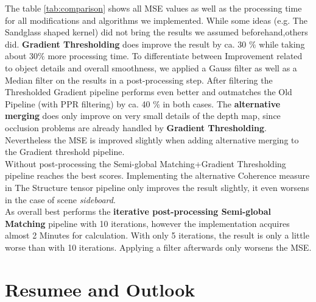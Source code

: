 \documentclass  [
  paper    = a4,
  BCOR     = 10mm,
  twoside,
  fontsize = 12pt,
  fleqn,
  toc      = bibnumbered,
  toc      = listofnumbered,
  numbers  = noendperiod,
  headings = normal,
  listof   = leveldown,
  version  = 3.03
]                                       {scrreprt}
\begin{document}
The table \ref{tab:comparison}  shows all MSE values as well as the processing time for all modifications and algorithms we implemented. While some ideas (e.g. The Sandglass shaped kernel) did not bring the results we assumed beforehand,others did. \textbf{ Gradient Thresholding} does improve the result by ca. 30 $\%$ while taking about 30$\%$ more processing time. To differentiate between Improvement related to object details and overall smoothness, we applied a Gauss filter as well as a Median filter on the results in a post-processing step. After filtering the Thresholded Gradient pipeline performs even better and outmatches the Old Pipeline (with PPR filtering) by ca. 40 $\%$ in both cases. The \textbf{alternative merging} does only improve on very small details of the depth map, since occlusion problems are already handled by \textbf{ Gradient Thresholding}. Nevertheless the MSE is improved slightly when adding alternative merging to the Gradient threshold pipeline.\\
Without post-processing the Semi-global Matching+Gradient Thresholding pipeline reaches the best scores. Implementing the alternative Coherence measure in The Structure tensor pipeline only improves the result slightly, it even worsens in the case of scene \textit{sideboard}.\\
As overall best performs the \textbf{iterative post-processing Semi-global Matching} pipeline with 10 iterations, however the implementation acquires almost 2 Minutes for calculation. With only 5 iterations, the result is only a little worse than with 10 iterations. Applying a filter afterwards only worsens the MSE.

\chapter{Resumee and Outlook}
\end{document}
